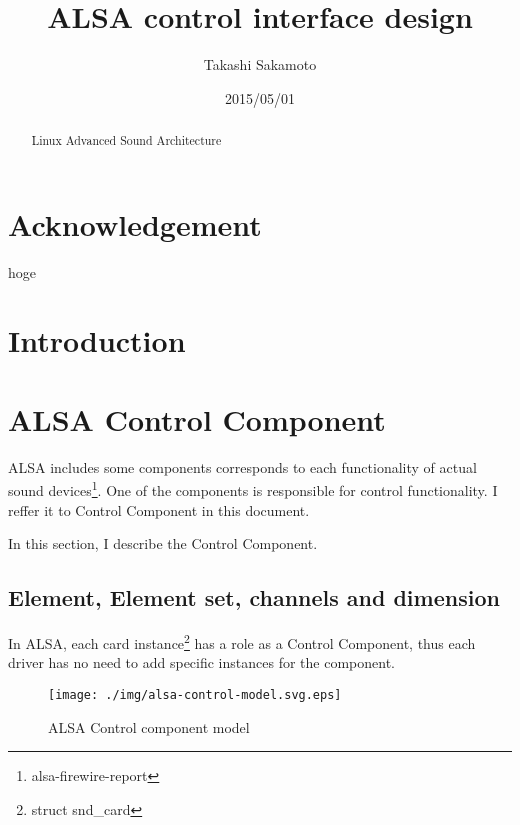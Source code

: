 \documentclass[onecolumn]{article}
\begin{document}

\title{ALSA control interface design}
\author{Takashi Sakamoto}
\date{2015/05/01}
\maketitle{}

\begin{abstract}

Linux Advanced Sound Architecture

\end{abstract}

\section*{Acknowledgement}

hoge

\newpage

\tableofcontents

\newpage


\section{Introduction}

\section{ALSA Control Component}

ALSA includes some components corresponds to each functionality of actual sound devices\footnote{alsa-firewire-report}. One of the components is responsible for control functionality. I reffer it to Control Component in this document.

In this section, I describe the Control Component.

\subsection{Element, Element set, channels and dimension}

In ALSA, each card instance\footnote{struct snd\_card} has a role as a Control Component, thus each driver has no need to add specific instances for the component.

\begin{figure}[htbp]
	\centering
	\texttt{[image: ./img/alsa-control-model.svg.eps]}
	\caption{{ALSA Control component model}}
	\label{fig:alsa-control-model}
\end{figure}
\end{document}
